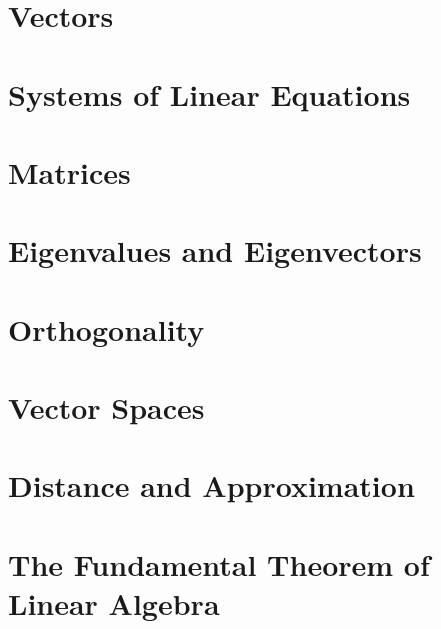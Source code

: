\documentclass[10pt,a4paper,oneside]{book}
\begin{document}
\tableofcontents

\chapter{Vectors}


\chapter{Systems of Linear Equations}


\chapter{Matrices}


\chapter{Eigenvalues and Eigenvectors}


\chapter{Orthogonality}


\chapter{Vector Spaces}


\chapter{Distance and Approximation}


\appendix\chapter{The Fundamental Theorem of Linear Algebra}

\end{document}
